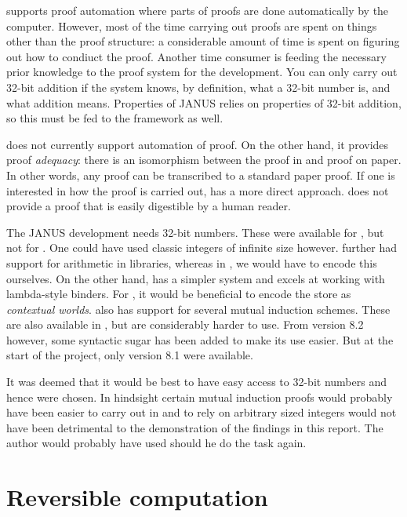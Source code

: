 \coq{} supports proof automation where parts of proofs are done
automatically by the computer. However, most of the time carrying out
proofs are spent on things other than the proof structure: a
considerable amount of time is spent on figuring out how to condiuct
the proof. Another time consumer is feeding the necessary prior
knowledge to the proof system for the development. You can only carry
out 32-bit addition if the system knows, by definition, what a 32-bit
number is, and what addition means. Properties of JANUS relies on
properties of 32-bit addition, so this must be fed to the framework as
well.

\twelf{} does not currently support automation of proof. On the other
hand, it provides proof \emph{adequacy}: there is an isomorphism
between the proof in \twelf{} and proof on paper. In other words, any
proof can be transcribed to a standard paper proof. If one is
interested in how the proof is carried out, \twelf{} has a more direct
approach. \coq{} does not provide a proof that is easily digestible by
a human reader.

The JANUS development needs 32-bit numbers. These were available
for \coq{}, but not for \twelf{}. One could have used classic integers of
infinite size however. \coq{} further had support for arithmetic in
libraries, whereas in \twelf{}, we would have to encode this
ourselves. On the other hand, \twelf{} has a simpler system and excels at
working with lambda-style binders. For \twelf{}, it would be beneficial
to encode the store as \emph{contextual worlds}. \twelf{} also has
support for several mutual induction schemes. These are also available
in \coq{}, but are considerably harder to use. From \coq{} version 8.2
however, some syntactic sugar has been added to make its use
easier. But at the start of the project, only \coq{} version 8.1 were
available.


It was deemed that it would be best to have easy access to 32-bit
numbers and hence \coq{} were chosen. In hindsight certain mutual
induction proofs would probably have been easier to carry out in
\twelf{} and to rely on arbitrary sized integers would not have been
detrimental to the demonstration of the findings in this report. The
author would probably have used \twelf{} should he do the task again.

\section{Reversible computation}
\label{sec:revers-comp}

